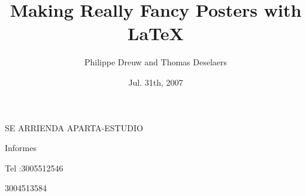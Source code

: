 \documentclass[final]{beamer}
\title[Fancy Posters]{Making Really Fancy Posters with \LaTeX}
\author[Dreuw \& Deselaers]{Philippe Dreuw and Thomas Deselaers}
\institute[RWTH Aachen University]{Human Language Technology and Pattern Recognition,RWTH Aachen University}
\date{Jul. 31th, 2007}
\begin{document}
  \begin{frame}{} 
    \vfill
    \begin{block}
      \centering
      {\VeryHuge SE ARRIENDA APARTA-ESTUDIO}\par
      \par
      {\Large Informes}\par
      {\large Tel :3005512546}\par
      {\large 3004513584}\par
    \end{block}
    \vfill
   

  \end{frame}
\end{document}
